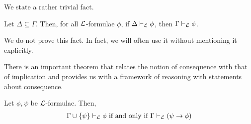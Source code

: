 We state a rather trivial fact.

\begin{boxlemma}\label{Ch1:Lemma:SubsetOfGamma}
    Let $\Delta \subseteq \Gamma$. Then, for all $\mathcal{L}$-formulae $\phi$, if $\Delta \vdash_{\mathcal{L}} \phi$, then $\Gamma \vdash_{\mathcal{L}} \phi$.
\end{boxlemma}

We do not prove this fact. In fact, we will often use it without mentioning it explicitly.

There is an important theorem that relates the notion of consequence with that of implication and provides us with a framework of reasoning with statements about consequence.

\begin{boxtheorem}\label{Ch1:Thm:DeductionThm} %
    Let $\phi, \psi$ be $\mathcal{L}$-formulae. Then,
    \begin{align*}
        \Gamma \cup \left\{ \psi \right\} \vdash_{\mathcal{L}} \phi
        \text{ if and only if }
        \Gamma \vdash_{\mathcal{L}} \left( \psi \to \phi \right)
    \end{align*}
\end{boxtheorem}
